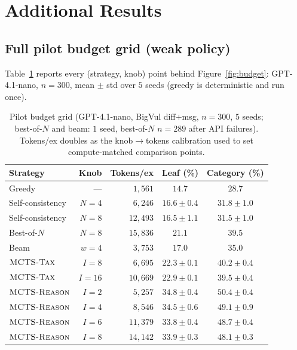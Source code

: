 \section{Additional Results}
\label{app:extra}

\subsection{Full pilot budget grid (weak policy)}
Table~\ref{tab:a2} reports every (strategy, knob) point behind
Figure~\ref{fig:budget}: GPT-4.1-nano, $n{=}300$, mean $\pm$ std over $5$ seeds
(greedy is deterministic and run once).

\begin{table}[h]
\centering
\small
\begin{tabular}{l r r cc}
\toprule
Strategy & Knob & Tokens/ex & Leaf (\%) & Category (\%) \\
\midrule
Greedy           & ---      & $1{,}561$  & $14.7$            & $28.7$ \\
Self-consistency & $N{=}4$  & $6{,}246$  & $16.6 \pm 0.4$    & $31.8 \pm 1.0$ \\
Self-consistency & $N{=}8$  & $12{,}493$ & $16.5 \pm 1.1$    & $31.5 \pm 1.0$ \\
Best-of-$N$      & $N{=}8$  & $15{,}836$ & $21.1$            & $39.5$ \\
Beam             & $w{=}4$  & $3{,}753$  & $17.0$            & $35.0$ \\
$\textsc{MCTS-Tax}$       & $I{=}8$  & $6{,}695$  & $22.3 \pm 0.1$    & $40.2 \pm 0.4$ \\
$\textsc{MCTS-Tax}$       & $I{=}16$ & $10{,}669$ & $22.9 \pm 0.1$    & $39.5 \pm 0.4$ \\
$\textsc{MCTS-Reason}$      & $I{=}2$  & $5{,}257$  & $\mathbf{34.8 \pm 0.4}$ & $\mathbf{50.4 \pm 0.4}$ \\
$\textsc{MCTS-Reason}$      & $I{=}4$  & $8{,}546$  & $34.5 \pm 0.6$    & $49.1 \pm 0.9$ \\
$\textsc{MCTS-Reason}$      & $I{=}6$  & $11{,}379$ & $33.8 \pm 0.4$    & $48.7 \pm 0.4$ \\
$\textsc{MCTS-Reason}$      & $I{=}8$  & $14{,}142$ & $33.9 \pm 0.3$    & $48.1 \pm 0.3$ \\
\bottomrule
\end{tabular}
\caption{Pilot budget grid (GPT-4.1-nano, BigVul diff$+$msg, $n{=}300$, $5$
seeds; best-of-$N$ and beam: $1$ seed, best-of-$N$ $n{=}289$ after API
failures). Tokens/ex doubles as the knob$\to$tokens calibration used to set
compute-matched comparison points.}
\label{tab:a2}
\end{table}

